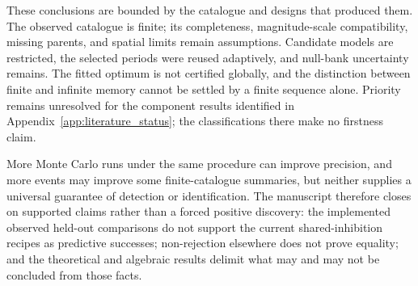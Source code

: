 These conclusions are bounded by the catalogue and designs that produced them. The observed catalogue is finite; its completeness, magnitude-scale compatibility, missing parents, and spatial limits remain assumptions. Candidate models are restricted, the selected periods were reused adaptively, and null-bank uncertainty remains. The fitted optimum is not certified globally, and the distinction between finite and infinite memory cannot be settled by a finite sequence alone. Priority remains unresolved for the component results identified in Appendix~\ref{app:literature_status}; the classifications there make no firstness claim.

More Monte Carlo runs under the same procedure can improve precision, and more events may improve some finite-catalogue summaries, but neither supplies a universal guarantee of detection or identification. The manuscript therefore closes on supported claims rather than a forced positive discovery: the implemented observed held-out comparisons do not support the current shared-inhibition recipes as predictive successes; non-rejection elsewhere does not prove equality; and the theoretical and algebraic results delimit what may and may not be concluded from those facts.
